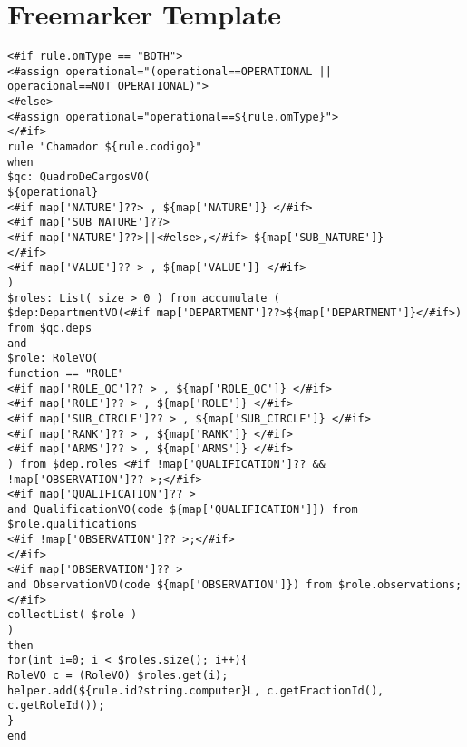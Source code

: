 \appendix
\section{Freemarker Template}
\label{appendix:template} 

\begin{lstlisting}[frame=single, language=Freemarker, caption={\it Freemarker template for generating DRL}, label={code:template},basicstyle=\scriptsize]
<#if rule.omType == "BOTH">
<#assign operational="(operational==OPERATIONAL || operacional==NOT_OPERATIONAL)">
<#else>
<#assign operational="operational==${rule.omType}">
</#if>
rule "Chamador ${rule.codigo}"   	
when
$qc: QuadroDeCargosVO( 
${operational} 				
<#if map['NATURE']??> , ${map['NATURE']} </#if>
<#if map['SUB_NATURE']??>
<#if map['NATURE']??>||<#else>,</#if> ${map['SUB_NATURE']}
</#if>
<#if map['VALUE']?? > , ${map['VALUE']} </#if> 
)	
$roles: List( size > 0 ) from accumulate ( 
$dep:DepartmentVO(<#if map['DEPARTMENT']??>${map['DEPARTMENT']}</#if>) from $qc.deps				  		   
and
$role: RoleVO(
function == "ROLE"
<#if map['ROLE_QC']?? > , ${map['ROLE_QC']} </#if>
<#if map['ROLE']?? > , ${map['ROLE']} </#if>
<#if map['SUB_CIRCLE']?? > , ${map['SUB_CIRCLE']} </#if> 
<#if map['RANK']?? > , ${map['RANK']} </#if>	
<#if map['ARMS']?? > , ${map['ARMS']} </#if>	 										
) from $dep.roles <#if !map['QUALIFICATION']?? && !map['OBSERVATION']?? >;</#if>		
<#if map['QUALIFICATION']?? >
and QualificationVO(code ${map['QUALIFICATION']}) from $role.qualifications 
<#if !map['OBSERVATION']?? >;</#if>	
</#if>				
<#if map['OBSERVATION']?? >
and ObservationVO(code ${map['OBSERVATION']}) from $role.observations;	
</#if>					
collectList( $role )
) 		
then		 
for(int i=0; i < $roles.size(); i++){       	
RoleVO c = (RoleVO) $roles.get(i);
helper.add(${rule.id?string.computer}L, c.getFractionId(), c.getRoleId());       
}               
end
\end{lstlisting}